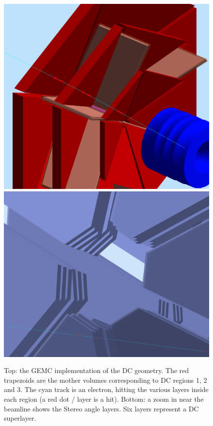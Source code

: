 \begin{figure}
	\centering
	\includegraphics[width=0.95\columnwidth,keepaspectratio]{img/dcGeometry.png}
	\includegraphics[width=0.95\columnwidth,keepaspectratio]{img/dcDetail.png}
	\caption{Top: the GEMC implementation of the DC geometry. The red trapezoids are the mother volumes corresponding to DC regions 1, 2 and 3. The cyan track is an electron, hitting the various
		      layers inside each region (a red dot / layer is a hit). Bottom: a zoom in near the beamline shows the Stereo angle layers. Six layers represent a DC superlayer.}
	\label{fig:dcGeometry}
\end{figure}


